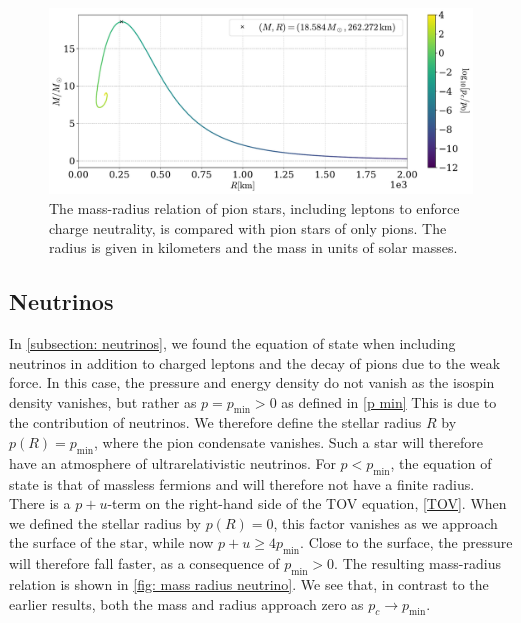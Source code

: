 \begin{figure}[!htb]
    \centering
    \includegraphics[width=\textwidth]{../scripts/figurer/pion_star/mass_radius__mu.pdf}
    \caption{
        The mass-radius relation of pion stars, including leptons to enforce charge neutrality, is compared with pion stars of only pions.
        The radius is given in kilometers and the mass in units of solar masses.
        }
        \label{fig: mass-radius relation with muons}
\end{figure}



\subsection{Neutrinos}

In \autoref{subsection: neutrinos}, we found the equation of state when including neutrinos in addition to charged leptons and the decay of pions due to the weak force.
In this case, the pressure and energy density do not vanish as the isospin density vanishes, but rather as $p = p_\text{min}>0$ as defined in \autoref{p min}
This is due to the contribution of neutrinos.
We therefore define the stellar radius $R$ by $p(R) = p_\text{min}$, where the pion condensate vanishes.
Such a star will therefore have an atmosphere of ultrarelativistic neutrinos.
For $p < p_\text{min}$, the equation of state is that of massless fermions and will therefore not have a finite radius.
There is a $p+u$-term on the right-hand side of the TOV equation, \autoref{TOV}.
When we defined the stellar radius by $p(R) = 0$, this factor vanishes as we approach the surface of the star, while now $p+u \geq 4 p_\text{min}$.
Close to the surface, the pressure will therefore fall faster, as a consequence of $p_\text{min}>0$.
The resulting mass-radius relation is shown in \autoref{fig: mass radius neutrino}.
We see that, in contrast to the earlier results, both the mass and radius approach zero as $p_c \rightarrow p_\text{min}$.


